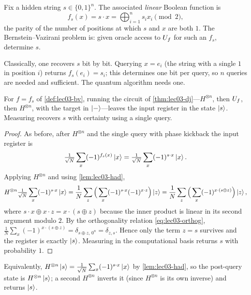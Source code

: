 \begin{definition}
\label{def:lec03-bv}
Fix a hidden string $s\in\{0,1\}^n$. The associated \emph{linear} Boolean function
is
\[
  f_s(x)=s\cdot x=\bigoplus_{i=1}^{n}s_i x_i \pmod 2,
\]
the parity of the number of positions at which $s$ and $x$ are both $1$. The
Bernstein--Vazirani problem is: given oracle access to $U_{f}$ for such an $f_s$,
determine $s$.
\end{definition}

Classically, one recovers $s$ bit by bit. Querying $x=e_i$ (the string with a
single $1$ in position $i$) returns $f_s(e_i)=s_i$; this determines one bit per
query, so $n$ queries are needed and sufficient. The quantum algorithm needs one.

\begin{theorem}
\label{thm:lec03-bv}
For $f=f_s$ of \cref{def:lec03-bv}, running the circuit of
\cref{thm:lec03-dj}---$H^{\otimes n}$, then $U_{f}$, then $H^{\otimes n}$, with the
target in $\ket{-}$---leaves the input register in the state $\ket{s}$. Measuring
recovers $s$ with certainty using a single query.
\end{theorem}

\begin{proof}
As before, after $H^{\otimes n}$ and the single query with phase kickback the
input register is
\[
  \tfrac{1}{\sqrt N}\sum_{x}(-1)^{f_s(x)}\ket{x}
  =\tfrac{1}{\sqrt N}\sum_{x}(-1)^{s\cdot x}\ket{x}.
\]
Applying $H^{\otimes n}$ and using \cref{lem:lec03-had},
\[
  H^{\otimes n}\tfrac{1}{\sqrt N}\sum_{x}(-1)^{s\cdot x}\ket{x}
  =\frac{1}{N}\sum_{z}\Big(\sum_{x}(-1)^{s\cdot x}(-1)^{x\cdot z}\Big)\ket{z}
  =\frac{1}{N}\sum_{z}\Big(\sum_{x}(-1)^{x\cdot(s\oplus z)}\Big)\ket{z},
\]
where $s\cdot x\oplus x\cdot z=x\cdot(s\oplus z)$ because the inner product is
linear in its second argument modulo $2$. By the orthogonality relation
\eqref{eq:lec03-orthog}, $\tfrac{1}{N}\sum_{x}(-1)^{x\cdot(s\oplus z)}
=\delta_{s\oplus z,\,0^n}=\delta_{z,s}$. Hence only the term $z=s$ survives and the
register is exactly $\ket{s}$. Measuring in the computational basis returns $s$
with probability $1$.
\end{proof}

Equivalently, $H^{\otimes n}\ket{s}=\tfrac{1}{\sqrt N}\sum_x(-1)^{s\cdot x}\ket{x}$
by \cref{lem:lec03-had}, so the post-query state is $H^{\otimes n}\ket{s}$; a
second $H^{\otimes n}$ inverts it (since $H^{\otimes n}$ is its own inverse) and
returns $\ket{s}$.

